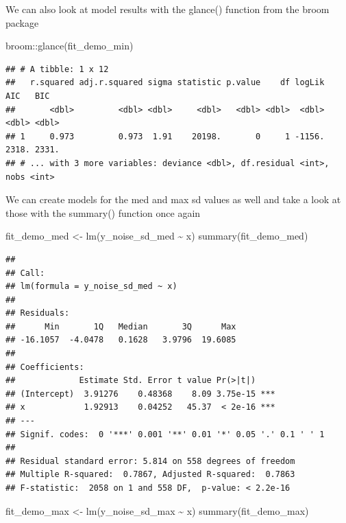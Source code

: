 \documentclass[
]{book}
\newenvironment{Shaded}{\begin{snugshade}}{\end{snugshade}}
\newcommand{\FunctionTok}[1]{\textcolor[rgb]{0.00,0.00,0.00}{#1}}
\newcommand{\NormalTok}[1]{#1}
\newcommand{\OtherTok}[1]{\textcolor[rgb]{0.56,0.35,0.01}{#1}}
\newcommand{\SpecialCharTok}[1]{\textcolor[rgb]{0.00,0.00,0.00}{#1}}
\begin{document}
We can also look at model results with the glance() function from the broom package

\begin{Shaded}
\begin{Highlighting}[]
\NormalTok{broom}\SpecialCharTok{::}\FunctionTok{glance}\NormalTok{(fit\_demo\_min)}
\end{Highlighting}
\end{Shaded}

\begin{verbatim}
## # A tibble: 1 x 12
##   r.squared adj.r.squared sigma statistic p.value    df logLik   AIC   BIC
##       <dbl>         <dbl> <dbl>     <dbl>   <dbl> <dbl>  <dbl> <dbl> <dbl>
## 1     0.973         0.973  1.91    20198.       0     1 -1156. 2318. 2331.
## # ... with 3 more variables: deviance <dbl>, df.residual <int>, nobs <int>
\end{verbatim}

We can create models for the med and max sd values as well and take a look at those with the summary() function once again

\begin{Shaded}
\begin{Highlighting}[]
\NormalTok{fit\_demo\_med }\OtherTok{\textless{}{-}} \FunctionTok{lm}\NormalTok{(y\_noise\_sd\_med }\SpecialCharTok{\textasciitilde{}}\NormalTok{ x)}
\FunctionTok{summary}\NormalTok{(fit\_demo\_med)}
\end{Highlighting}
\end{Shaded}

\begin{verbatim}
## 
## Call:
## lm(formula = y_noise_sd_med ~ x)
## 
## Residuals:
##      Min       1Q   Median       3Q      Max 
## -16.1057  -4.0478   0.1628   3.9796  19.6085 
## 
## Coefficients:
##             Estimate Std. Error t value Pr(>|t|)    
## (Intercept)  3.91276    0.48368    8.09 3.75e-15 ***
## x            1.92913    0.04252   45.37  < 2e-16 ***
## ---
## Signif. codes:  0 '***' 0.001 '**' 0.01 '*' 0.05 '.' 0.1 ' ' 1
## 
## Residual standard error: 5.814 on 558 degrees of freedom
## Multiple R-squared:  0.7867, Adjusted R-squared:  0.7863 
## F-statistic:  2058 on 1 and 558 DF,  p-value: < 2.2e-16
\end{verbatim}

\begin{Shaded}
\begin{Highlighting}[]
\NormalTok{fit\_demo\_max }\OtherTok{\textless{}{-}} \FunctionTok{lm}\NormalTok{(y\_noise\_sd\_max }\SpecialCharTok{\textasciitilde{}}\NormalTok{ x)}
\FunctionTok{summary}\NormalTok{(fit\_demo\_max)}
\end{Highlighting}
\end{Shaded}
\end{document}
